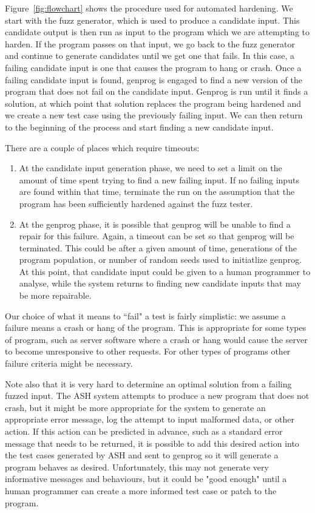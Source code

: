 \documentclass[conference]{IEEEtran}
\begin{document}
Figure~\ref{fig:flowchart} shows the procedure used for automated hardening.  We
start with the fuzz generator, which is used to produce a candidate input.
This candidate output is then run as input to the program which we are
attempting to harden.  If the program passes on that input, we go back to the
fuzz generator and continue to generate candidates until we get one that fails.
In this case, a failing candidate input is one that causes the program to hang
or crash.  Once a failing candidate input is found, genprog is engaged to find a
new version of the program that does not fail on the candidate input.  Genprog
is run until it finds a solution, at which point that solution replaces the
program being hardened and we create a new test case using the previously
failing input.  We can then return to the beginning of the process and start
finding a new candidate input.

There are a couple of places which require timeouts: 

\begin{enumerate}
\item At the candidate input
generation phase, we need to set a limit on the amount of time spent trying to
find a new failing input.  If no failing inputs are found within that time,
terminate the run on the assumption that the program has been sufficiently
hardened against the fuzz tester.

\item At the genprog phase, it is possible that genprog will be unable to find
a repair for this failure.  Again, a timeout can be set so that genprog will be
terminated.  This could be after a given amount of time, generations of the
program population, or number of random seeds used to initiatlize genprog.  At
this point, that candidate input could be given to a human programmer to
analyse, while the system returns to finding new candidate inputs that may be
more repairable.
\end{enumerate}

Our choice of what it means to ``fail" a test is fairly simplistic: we assume a
failure means a crash or hang of the program.  This is appropriate for some
types of program, such as server software where a crash or hang would cause the
server to become unresponsive to other requests.   For other types of programs
other failure criteria might be necessary. 

Note also that it is very hard to determine an optimal solution from a failing
fuzzed input.  The ASH system attempts to produce a new program that does not
crash, but it might be more appropriate for the system to generate an
appropriate error message, log the attempt to input malformed data, or other
action.  If this action can be predicted in advance, such as a standard error
message that needs to be returned, it is possible to add this desired action
into the test cases generated by ASH and sent to genprog so it will generate a
program behaves as desired.   Unfortunately, this may not generate very
informative messages and behaviours, but it could be "good enough" until a human
programmer can create a more informed test case or patch to the program.
\end{document}
